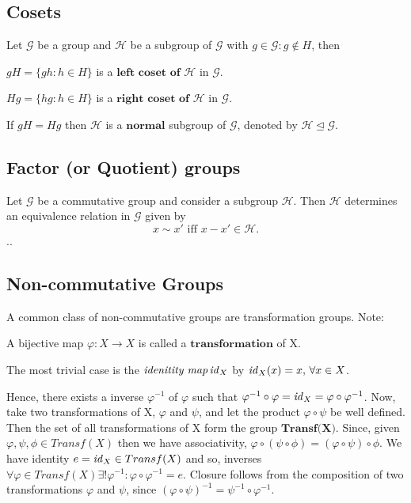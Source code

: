 \subsection{Cosets} %
\label{subsec:cosets}

Let $\mathcal{G}$ be a group and $\mathcal{H}$ be a subgroup of $\mathcal{G}$ with $g \in \mathcal{G} : g \notin H$, then
\begin{defn}
	$gH = \{gh : h \in H\}$ is a $\textbf{left coset of } \mathcal{H}$ in $\mathcal{G}$.
\end{defn}

\begin{defn}
	$Hg = \{hg : h \in H\}$ is a $\textbf{right coset of } \mathcal{H}$ in $\mathcal{G}$.
\end{defn}

\begin{defn}
	If $gH = Hg$ then $\mathcal{H}$ is a $\textbf{normal}$ subgroup of $\mathcal{G}$, denoted by $\mathcal{H} \unlhd \mathcal{G}$.
\end{defn}

\subsection{Factor (or Quotient) groups} %
\label{subsec:factorgroups}
Let $\mathcal{G}$ be a commutative group and consider a subgroup $\mathcal{H}$.
Then $\mathcal{H}$ determines an equivalence relation in $\mathcal{G}$ given by
\[
	x \sim x' \mbox{ iff } x - x' \in \mathcal{H}.
\]
..

\subsection{Non-commutative Groups} %
\label{sec:noncommutative-groups}
A common class of non-commutative groups are transformation groups.
Note:
\begin{defn}[Transformation]
 A bijective map $\varphi: X \to X$ is called a $\textbf{transformation}$ of X.
 \begin{note}
  The most trivial case is the $\emph{idenitity map} \, \mathit{id}_{X}$ by $\mathit{id}_{X}(x) = x, \, \forall x \in X$.
 \end{note}
\end{defn}
Hence, there exists a inverse $\varphi^{-1}$ of $\varphi$ such that $\varphi^{-1} \circ \varphi = \mathit{id}_{X} = \varphi \circ \varphi^{-1}$.
Now, take two transformations of X, $\varphi$ and $\psi$, and let the product $\varphi \circ \psi$ be well defined.
Then the set of all transformations of X form the group $\textbf{Transf(X)}$.
Since, given $\varphi , \psi , \phi \in Transf(X)$ then we have associativity, $\varphi \circ (\psi \circ \phi) = (\varphi \circ \psi) \circ \phi$.
We have identity $e = \mathit{id}_{X} \in Transf(X)$ and so, inverses $\forall \varphi \in Transf(X) \exists ! \varphi^{-1} : \varphi \circ \varphi^{-1} = e$.
Closure follows from the composition of two transformations $\varphi$ and $\psi$, since $(\varphi \circ \psi)^{-1} = \psi^{-1} \circ \varphi^{-1}$.

